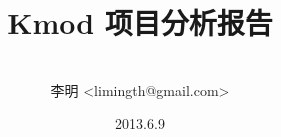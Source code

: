 \documentclass[12pt, a4paper]{book}
\begin{document}
\title{Kmod 项目分析报告}
\author{\\李明 <limingth@gmail.com>}
\date{2013.6.9}
\maketitle
\tableofcontents


\end{document}
